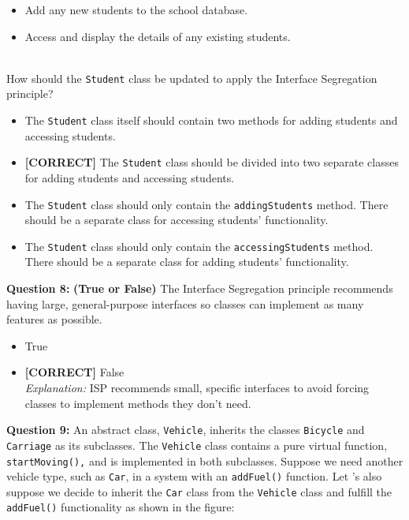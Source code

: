 \begin{itemize}
\tightlist
\item
Add any new students to the school database.
\item
Access and display the details of any existing students.
\end{itemize}
\\
How should the \texttt{Student} class be updated to apply the Interface Segregation principle?
\\[0.2cm]
\begin{itemize}
 \item The \texttt{Student} class itself should contain two methods for adding students and accessing students.
 \item \textbf{[CORRECT]} The \texttt{Student} class should be divided into two separate classes for adding students and accessing students.
 \item The \texttt{Student} class should only contain the \texttt{addingStudents} method. There should be a separate class for accessing students' functionality.
 \item The \texttt{Student} class should only contain the \texttt{accessingStudents} method. There should be a separate class for adding students' functionality.
\end{itemize}
\vspace{0.3cm}
\noindent
\textbf{Question 8:} \textbf{(True or False)} The Interface Segregation principle recommends having large, general-purpose interfaces so classes can implement as many features as possible.
\\[0.2cm]
\begin{itemize}
 \item True
 \item \textbf{[CORRECT]} False
\\[0.1cm]
\textit{Explanation:} 
ISP recommends small, specific interfaces to avoid forcing classes to implement methods they don't need.
\end{itemize}
\vspace{0.3cm}
\noindent
\textbf{Question 9:} An abstract class, \texttt{Vehicle}, inherits the classes \texttt{Bicycle} and \texttt{Carriage} as its subclasses. The
\texttt{Vehicle} class contains a pure virtual function, \texttt{startMoving(),} and is implemented in both subclasses. Suppose we need another vehicle type, such as \texttt{Car}, in a system with an \texttt{addFuel()} function. Let
's also suppose we decide to inherit the \texttt{Car} class from the \texttt{Vehicle} class and fulfill the \texttt{addFuel()} functionality as shown in the figure:
